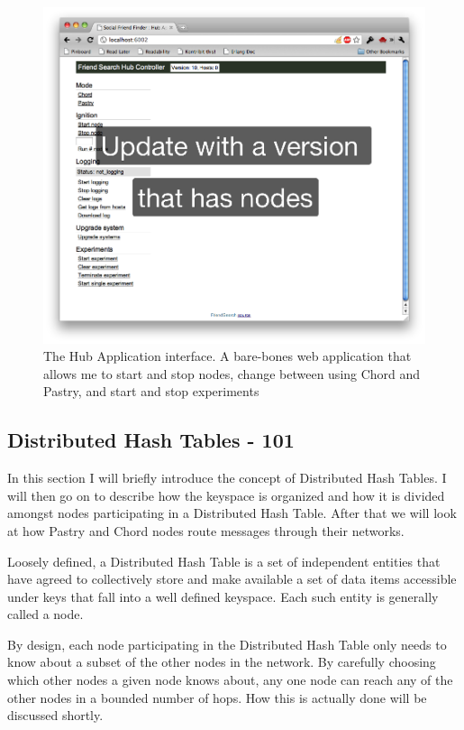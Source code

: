 \begin{figure}[!htb]
\begin{center}
	\includegraphics[width=0.9\linewidth]{illustrations/HubApp.png}
\caption{The Hub Application interface. A bare-bones web application that allows me to start and stop nodes, change between using Chord and Pastry, and start and stop experiments}
\label{hubApp}
\end{center}
\end{figure}


\subsection{Distributed Hash Tables - 101}

In this section I will briefly introduce the concept of Distributed Hash Tables. I will then go on to describe how the keyspace is organized and how it is divided amongst nodes participating in a Distributed Hash Table. After that we will look at how Pastry and Chord nodes route messages through their networks.

\mbox{}

Loosely defined, a Distributed Hash Table is a set of independent entities that have agreed to collectively store and make available a set of data items accessible under keys that fall into a well defined keyspace. Each such entity is generally called a node. 

By design, each node participating in the Distributed Hash Table only needs to know about a subset of the other nodes in the network. By carefully choosing which other nodes a given node knows about, any one node can reach any of the other nodes in a bounded number of hops.
How this is actually done will be discussed shortly.

